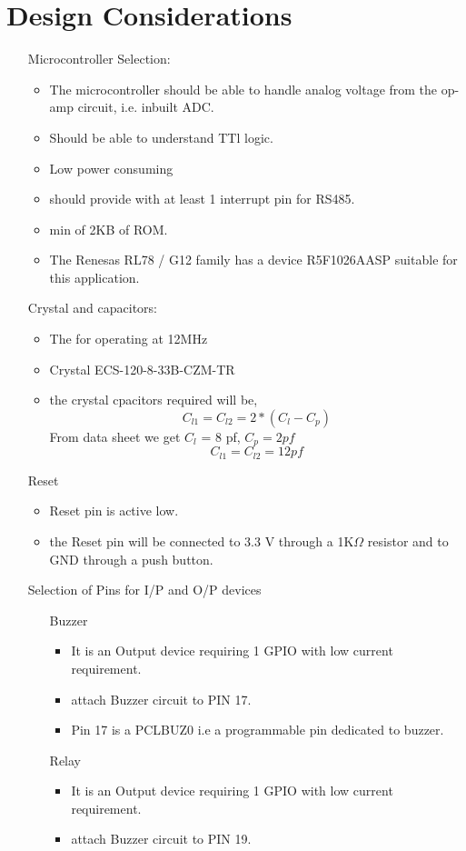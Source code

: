 \documentclass[11pt]{article}
\begin{document}
	\section{Design Considerations}
		\begin{itemize}
			\item[Microcontroller Selection:]
				\begin{itemize}
			\item The microcontroller should be able to handle analog voltage from the op-amp circuit, i.e. inbuilt ADC.
			\item Should be able to understand TTl logic.
			\item Low power consuming
			\item should provide with at least 1 interrupt pin for RS485.
			\item min of 2KB of ROM.
			\item The Renesas RL78 / G12 family has a device R5F1026AASP  suitable for this application.
				\end{itemize}
		
			\item[Crystal and capacitors:]
				\begin{itemize}
					\item The for operating at 12MHz
					\item Crystal ECS-120-8-33B-CZM-TR
					\item the crystal cpacitors required will be,\\
						$$ C_{l1} = C_{l2} = 2*(C_l - C_p)$$
						From data sheet we get $C_l$ = 8 pf, $C_p =  2pf$
						$$ C_{l1} = C_{l2} = 12 pf$$
				\end{itemize}
				
			\item[Reset]
				\begin{itemize}
					\item Reset pin is active low.
					\item the Reset pin will be connected to 3.3 V through a 1K$ \Omega$ resistor and to GND through a push button.
					 
				\end{itemize}
			\item[Selection of Pins for I/P and O/P devices]
				\begin{itemize}
					\item[Buzzer]
						\begin{itemize}
							\item It is an Output device requiring 1 GPIO with low current requirement.
							\item attach Buzzer circuit to PIN 17.
							\item Pin 17 is a PCLBUZ0 i.e a programmable pin dedicated to buzzer.
						\end{itemize}
					\item[Relay]
						\begin{itemize}
							\item It is an Output device requiring 1 GPIO with low current requirement.
							\item attach Buzzer circuit to PIN 19.
						\end{itemize}
						

\end{itemize}
\end{itemize}
\end{document}

